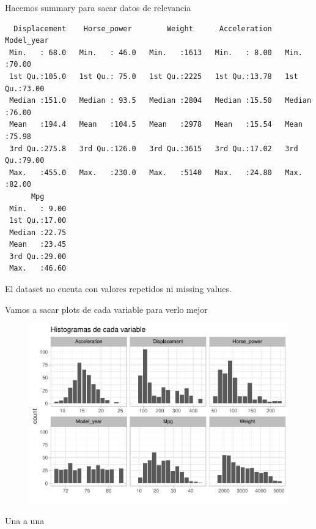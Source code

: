 \vspace{\baselineskip}

Hacemos summary para sacar datos de relevancia

\begin{verbatim}
  Displacement    Horse_power        Weight      Acceleration     Model_year   
 Min.   : 68.0   Min.   : 46.0   Min.   :1613   Min.   : 8.00   Min.   :70.00  
 1st Qu.:105.0   1st Qu.: 75.0   1st Qu.:2225   1st Qu.:13.78   1st Qu.:73.00  
 Median :151.0   Median : 93.5   Median :2804   Median :15.50   Median :76.00  
 Mean   :194.4   Mean   :104.5   Mean   :2978   Mean   :15.54   Mean   :75.98  
 3rd Qu.:275.8   3rd Qu.:126.0   3rd Qu.:3615   3rd Qu.:17.02   3rd Qu.:79.00  
 Max.   :455.0   Max.   :230.0   Max.   :5140   Max.   :24.80   Max.   :82.00  
      Mpg       
 Min.   : 9.00  
 1st Qu.:17.00  
 Median :22.75  
 Mean   :23.45  
 3rd Qu.:29.00  
 Max.   :46.60  
\end{verbatim}

\vspace{\baselineskip}

El dataset no cuenta con valores repetidos ni missing values.

\vspace{\baselineskip}

Vamos a sacar plots de cada variable para verlo mejor

\begin{figure}[H]\includegraphics[width=.9\linewidth]{img/EDA_files/figure-latex/unnamed-chunk-6-1} \caption{}\end{figure}

Una a una


